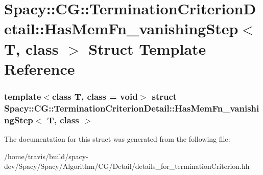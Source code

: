 \hypertarget{structSpacy_1_1CG_1_1TerminationCriterionDetail_1_1HasMemFn__vanishingStep}{\section{\-Spacy\-:\-:\-C\-G\-:\-:\-Termination\-Criterion\-Detail\-:\-:\-Has\-Mem\-Fn\-\_\-vanishing\-Step$<$ \-T, class $>$ \-Struct \-Template \-Reference}
\label{structSpacy_1_1CG_1_1TerminationCriterionDetail_1_1HasMemFn__vanishingStep}
}
\subsubsection*{template$<$class T, class = void$>$ struct Spacy\-::\-C\-G\-::\-Termination\-Criterion\-Detail\-::\-Has\-Mem\-Fn\-\_\-vanishing\-Step$<$ T, class $>$}



\-The documentation for this struct was generated from the following file\-:\begin{DoxyCompactItemize}
\item 
/home/travis/build/spacy-\/dev/\-Spacy/\-Spacy/\-Algorithm/\-C\-G/\-Detail/details\-\_\-for\-\_\-termination\-Criterion.\-hh\end{DoxyCompactItemize}
